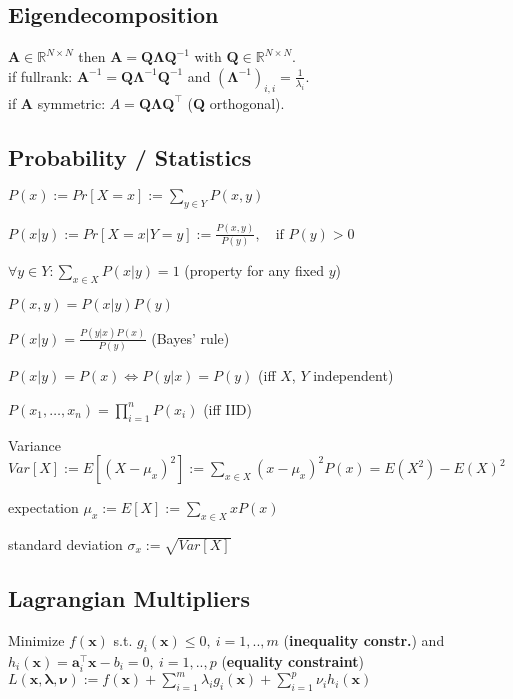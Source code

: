 \subsection*{Eigendecomposition}
$\mathbf{A} \in \mathbb{R}^{N \times N}$ then $\mathbf{A} = \mathbf{Q} \boldsymbol{\Lambda} \mathbf{Q}^{-1}$ with $\mathbf{Q} \in \mathbb{R}^{N \times N}$.\\
if fullrank: $\mathbf{A}^{-1} = \mathbf{Q} \boldsymbol{\Lambda}^{-1} \mathbf{Q}^{-1}$ and $(\boldsymbol{\Lambda}^{-1})_{i,i} = \frac{1}{\lambda_i}$.\\
if $\mathbf{A}$ symmetric: $A = \mathbf{Q} \boldsymbol{\Lambda} \mathbf{Q^\top}$ ($\mathbf{Q}$ orthogonal).

\subsection*{Probability / Statistics}
\begin{inparaitem}
	\item $P(x) := Pr[X = x] := \sum_{y \in Y} P(x, y)$
	\item $P(x|y) := Pr[X = x | Y = y] := \frac{P(x,y)}{P(y)},\quad \text{if } P(y) > 0$
	\item $\forall y \in Y: \sum_{x \in X} P(x|y) = 1$ (property for any fixed $y$)
	\item $P(x, y) = P(x|y) P(y)$
	\item $P(x|y) = \frac{P(y|x)P(x)}{P(y)}$ (Bayes' rule)
	\item $P(x|y) = P(x) \Leftrightarrow P(y|x) = P(y)$ (iff $X$, $Y$ independent)
	\item $P(x_1, \ldots, x_n) = \prod_{i=1}^n P(x_i)$ (iff IID)
	\item Variance $Var[X]:= E[(X-\mu_x)^2]:=\sum_{x \in X}(x-\mu_x)^2P(x)= E(X^2) - E(X)^2$
	\item expectation $\mu_x := E[X]:=\sum_{x \in X}xP(x)$
	\item standard deviation $\sigma_x := \sqrt{Var[X]}$
\end{inparaitem}


\subsection*{Lagrangian Multipliers}
Minimize  $f(\mathbf{x})$ s.t. $g_i(\mathbf{x}) \leq 0,\ i = 1, .., m$ (\textbf{inequality constr.}) and $h_i(\mathbf{x}) = \mathbf{a}_i^\top \mathbf{x} - b_i = 0,\ i = 1, .., p$ (\textbf{equality constraint}) \\
$L(\mathbf{x}, \boldsymbol{\lambda}, \boldsymbol{\nu}) := f(\mathbf{x}) + \sum_{i=1}^m \lambda_i g_i(\mathbf{x}) + \sum_{i=1}^p \nu_i h_i(\mathbf{x})$

